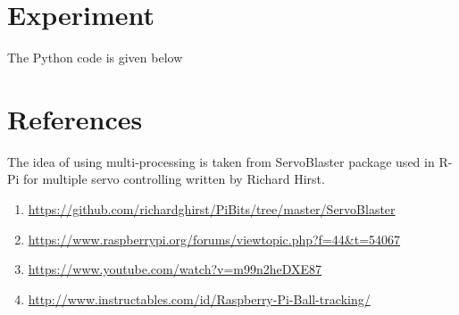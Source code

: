 \documentclass[11pt,a4paper]{article}
\begin{document}
	\section{Experiment}
	The Python code is given below
	
  	\section{References}
	The idea of using multi-processing is taken from ServoBlaster package used in R-Pi for  multiple servo controlling written by Richard Hirst.
	
	\begin{enumerate}
	\item \url{https://github.com/richardghirst/PiBits/tree/master/ServoBlaster}

     \item \url{https://www.raspberrypi.org/forums/viewtopic.php?f=44&t=54067}
     \item \url{https://www.youtube.com/watch?v=m99n2heDXE87}
      \item \url{http://www.instructables.com/id/Raspberry-Pi-Ball-tracking/}
   \end{enumerate}
 \newpage
\end{document}
